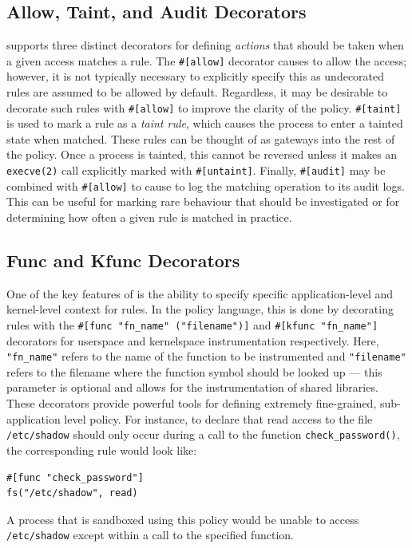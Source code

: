 \subsection{Allow, Taint, and Audit Decorators}%
\label{ss:bpfbox-allow}

\bpfbox{} supports three distinct decorators for defining \textit{actions} that should be
taken when a given access matches a rule. The \lstinline[language=bpfbox]{#[allow]}
decorator causes \bpfbox{} to allow the access; however, it is not typically necessary to
explicitly specify this as undecorated rules are assumed to be allowed by default.
Regardless, it may be desirable to decorate such rules with
\lstinline[language=bpfbox]{#[allow]} to improve the clarity of the policy.
\lstinline[language=bpfbox]{#[taint]} is used to mark a rule as a \textit{taint rule},
which causes the process to enter a tainted state when matched. These rules can be thought
of as gateways into the rest of the policy.  Once a process is tainted, this cannot be
reversed unless it makes an \texttt{execve(2)} call explicitly marked with
\lstinline[language=bpfbox]{#[untaint]}.  Finally, \lstinline[language=bpfbox]{#[audit]}
may be combined with \lstinline[language=bpfbox]{#[allow]} to cause \bpfbox{} to log the
matching operation to its audit logs. This can be useful for marking rare behaviour that
should be investigated or for determining how often a given rule is matched in practice.



\subsection{Func and Kfunc Decorators}%
\label{ss:bpfbox-kfunc}

One of the key features of \bpfbox{} is the ability to specify specific application-level
and kernel-level context for rules. In the policy language, this is done by decorating
rules with the \lstinline[language=bpfbox]{#[func "fn_name" ("filename")]} and
\lstinline[language=bpfbox]{#[kfunc "fn_name"]} decorators for userspace and kernelspace
instrumentation respectively. Here, \lstinline[language=bpfbox]{"fn_name"} refers to the
name of the function to be instrumented and \lstinline[language=bpfbox]{"filename"} refers
to the filename where the function symbol should be looked up --- this parameter is
optional and allows for the instrumentation of shared libraries.  These decorators provide
powerful tools for defining extremely fine-grained, sub-application level policy. For
instance, to declare that read access to the file \texttt{/etc/shadow} should only occur
during a call to the function \texttt{check\_password()}, the corresponding \bpfbox{} rule
would look like:
\begin{lstlisting}[language=bpfbox]
#[func "check_password"]
fs("/etc/shadow", read)
\end{lstlisting}
A process that is sandboxed using this policy would be unable to access
\texttt{/etc/shadow} except within a call to the specified function.



